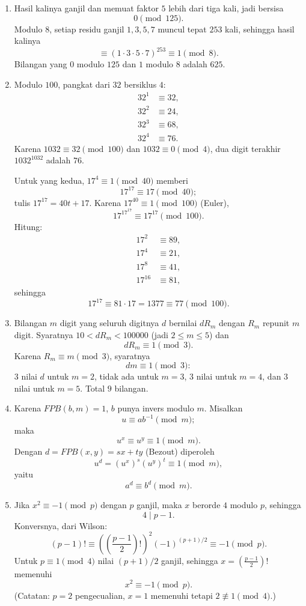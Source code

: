 \documentclass[12pt]{scrartcl}
\begin{document}
\begin{enumerate}[resume]
	\item Hasil kalinya ganjil dan memuat faktor $5$ lebih dari tiga kali,
	jadi bersisa
	\[ 0 \pmod{125}. \]
	Modulo $8$, setiap residu ganjil $1, 3, 5, 7$ muncul tepat $253$ kali,
	sehingga hasil kalinya
	\[ \equiv (1 \cdot 3 \cdot 5 \cdot 7)^{253} \equiv 1 \pmod{8}. \]
	Bilangan yang $0$ modulo $125$ dan $1$ modulo $8$ adalah $625$.

	\item Modulo $100$, pangkat dari $32$ bersiklus $4$:
	\begin{align*}
	32^1 &\equiv 32, \\
	32^2 &\equiv 24, \\
	32^3 &\equiv 68, \\
	32^4 &\equiv 76.
	\end{align*}
	Karena $1032 \equiv 32 \pmod{100}$ dan $1032 \equiv 0 \pmod{4}$,
	dua digit terakhir $1032^{1032}$ adalah $76$.

	Untuk yang kedua, $17^4 \equiv 1 \pmod{40}$ memberi
	\[ 17^{17} \equiv 17 \pmod{40}; \]
	tulis $17^{17} = 40t + 17$.
	Karena $17^{40} \equiv 1 \pmod{100}$ (Euler),
	\[ 17^{17^{17}} \equiv 17^{17} \pmod{100}. \]
	Hitung:
	\begin{align*}
	17^2 &\equiv 89, \\
	17^4 &\equiv 21, \\
	17^8 &\equiv 41, \\
	17^{16} &\equiv 81,
	\end{align*}
	sehingga
	\[ 17^{17} \equiv 81 \cdot 17 = 1377 \equiv 77 \pmod{100}. \]

	\item Bilangan $m$ digit yang seluruh digitnya $d$ bernilai $dR_m$
	dengan $R_m$ repunit $m$ digit.
	Syaratnya $10 < dR_m < 100000$ (jadi $2 \le m \le 5$)
	dan
	\[ dR_m \equiv 1 \pmod{3}. \]
	Karena $R_m \equiv m \pmod{3}$, syaratnya
	\[ dm \equiv 1 \pmod{3}: \]
	$3$ nilai $d$ untuk $m = 2$, tidak ada untuk $m = 3$,
	$3$ nilai untuk $m = 4$, dan $3$ nilai untuk $m = 5$.
	Total $9$ bilangan.

	\item Karena $FPB(b, m) = 1$, $b$ punya invers modulo $m$.
	Misalkan
	\[ u \equiv ab^{-1} \pmod{m}; \]
	maka
	\[ u^x \equiv u^y \equiv 1 \pmod{m}. \]
	Dengan $d = FPB(x, y) = sx + ty$ (Bezout) diperoleh
	\[ u^d = (u^x)^s(u^y)^t \equiv 1 \pmod{m}, \]
	yaitu
	\[ a^d \equiv b^d \pmod{m}. \]

	\item Jika $x^2 \equiv -1 \pmod{p}$ dengan $p$ ganjil,
	maka $x$ berorde $4$ modulo $p$, sehingga
	\[ 4 \mid p - 1. \]
	Konversnya, dari Wilson:
	\[ (p-1)! \equiv \left(\left(\frac{p-1}{2}\right)!\right)^2(-1)^{(p+1)/2} \equiv -1 \pmod{p}. \]
	Untuk $p \equiv 1 \pmod{4}$ nilai $(p+1)/2$ ganjil,
	sehingga $x = \left(\frac{p-1}{2}\right)!$ memenuhi
	\[ x^2 \equiv -1 \pmod{p}. \]
	(Catatan: $p = 2$ pengecualian, $x = 1$ memenuhi tetapi $2 \not\equiv 1 \pmod{4}$.)


\end{enumerate}
\end{document}
